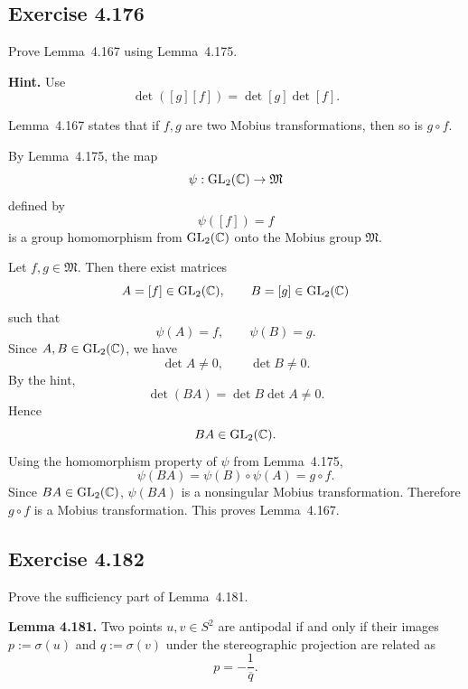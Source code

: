 \documentclass{article}
\providecommand{\Mob}{\mathfrak{M}}
\providecommand{\GL}{\operatorname{GL}}
\begin{document}
\subsection{Exercise 4.176}

Prove Lemma~4.167 using Lemma~4.175.

\textbf{Hint.} Use
\[
  \det([g][f])=\det[g]\det[f].
\]

\begin{solution}
  Lemma~4.167 states that if $f,g$ are two Mobius transformations, then so is
  $g\circ f$.

  By Lemma~4.175, the map
  \[
    \psi:\GL_2(\C)\to\Mob
  \]
  defined by
  \[
    \psi([f])=f
  \]
  is a group homomorphism from $\GL_2(\C)$ onto the Mobius group $\Mob$.

  Let $f,g\in\Mob$. Then there exist matrices
  \[
    A=[f]\in\GL_2(\C),
    \qquad
    B=[g]\in\GL_2(\C)
  \]
  such that
  \[
    \psi(A)=f,
    \qquad
    \psi(B)=g.
  \]
  Since $A,B\in\GL_2(\C)$, we have
  \[
    \det A\ne0,
    \qquad
    \det B\ne0.
  \]
  By the hint,
  \[
    \det(BA)=\det B\det A\ne0.
  \]
  Hence
  \[
    BA\in\GL_2(\C).
  \]
  Using the homomorphism property of $\psi$ from Lemma~4.175,
  \[
    \psi(BA)=\psi(B)\circ\psi(A)=g\circ f.
  \]
  Since $BA\in\GL_2(\C)$, $\psi(BA)$ is a nonsingular Mobius transformation.
  Therefore $g\circ f$ is a Mobius transformation. This proves Lemma~4.167.
\end{solution}

\subsection{Exercise 4.182}

Prove the sufficiency part of Lemma~4.181.

\textbf{Lemma 4.181.}
Two points $u,v\in S^2$ are antipodal if and only if their images
$p:=\sigma(u)$ and $q:=\sigma(v)$ under the stereographic projection are
related as
\[
  p=-\frac1{\overline q}.
\]
\end{document}
